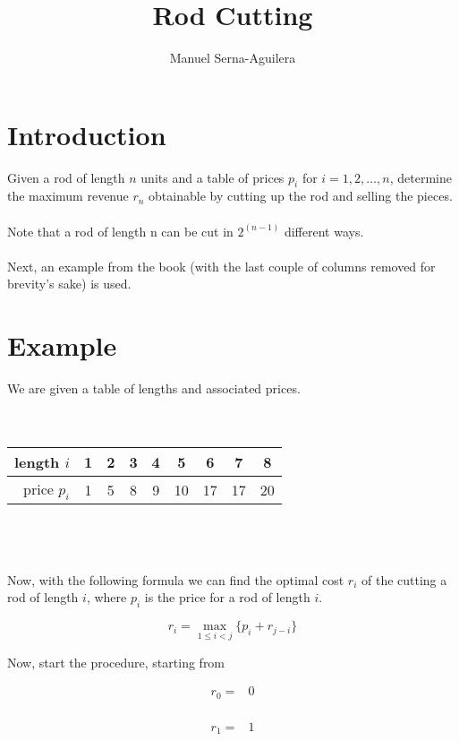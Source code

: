 \documentclass{article}
\title{Rod Cutting}
\author{Manuel Serna-Aguilera}
\date{}
\begin{document}
\maketitle

\section*{Introduction}
Given a rod of length $n$ units and a table of prices $p_i$ for $i = 1, 2, \ldots, n$, determine the maximum revenue $r_n$ obtainable by cutting up the rod and selling the pieces.
\\ \\
Note that a rod of length n can be cut in $2^{(n-1)}$ different ways.
\\ \\
Next, an example from the book (with the last couple of columns removed for brevity's sake) is used.

\section*{Example}
We are given a table of lengths and associated prices.
\\ \\ \\
\begin{tabular}{ | r | c c c c c c c c |}
\hline
length $i$  & 1 & 2 & 3 & 4 & 5 & 6 & 7 & 8 \\ \hline
price $p_i$ & 1 & 5 & 8 & 9 & 10 & 17 & 17 & 20 \\ \hline
\end{tabular}
\\ \\ \\
Now, with the following formula we can find the optimal cost $r_i$ of the cutting a rod of length $i$, where $p_i$ is the price for a rod of length $i$. 

\begin{equation*}
    r_i = \max\limits_{1 \leq i < j}\{p_i + r_{j-i}\}
\end{equation*}

Now, start the procedure, starting from 

\begin{equation*} \label{rc0}
\begin{split}
r_0 = & 0 \\
\end{split}
\end{equation*}

\begin{equation*} \label{rc1}
\begin{split}
r_1 = & 1 \\
\end{split}
\end{equation*}
\end{document}

